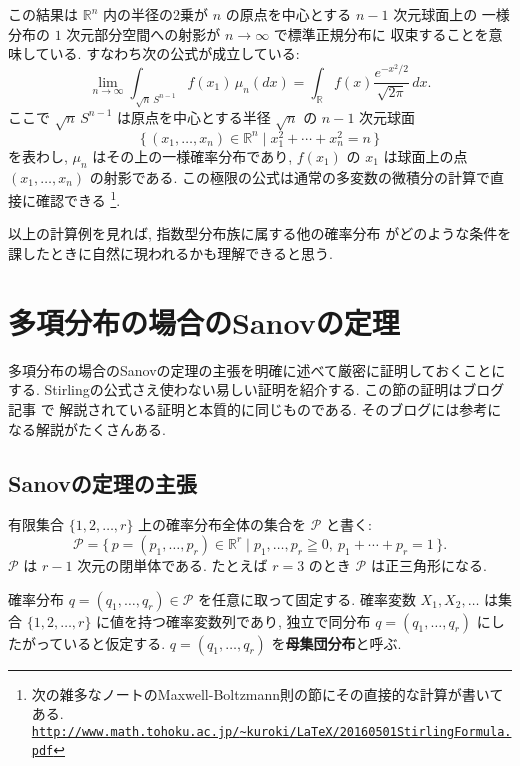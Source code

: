 \documentclass[12pt,twoside]{jarticle}
\newcommand\R{{\mathbb R}} %
\newcommand\cP{{\mathcal P}}
\theoremstyle{jplain}
\theoremstyle{jplain}
\theoremstyle{jplain}
\numberwithin{theorem}{section}
\numberwithin{equation}{section}
\numberwithin{figure}{section}
\numberwithin{table}{section}
\begin{document}
この結果は $\R^n$ 内の半径の2乗が $n$ の原点を中心とする $n-1$ 次元球面上の
一様分布の $1$ 次元部分空間への射影が $n\to\infty$ で標準正規分布に
収束することを意味している. すなわち次の公式が成立している:
\[
\lim_{n\to\infty}\int_{\sqrt{n}\,S^{n-1}} f(x_1)\,\mu_n(dx)
=\int_\R f(x)\frac{e^{-x^2/2}}{\sqrt{2\pi}}\,dx.
\]
ここで $\sqrt{n}\,S^{n-1}$ は原点を中心とする半径 $\sqrt{n}$ の $n-1$ 次元球面
\[
\{\,(x_1,\ldots,x_n)\in\R^n\mid x_1^2+\cdots+x_n^2=n\,\}
\]
を表わし, $\mu_n$ はその上の一様確率分布であり, 
$f(x_1)$ の $x_1$ は球面上の点 $(x_1,\ldots,x_n)$ の射影である.
この極限の公式は通常の多変数の微積分の計算で直接に確認できる%
\footnote{次の雑多なノートのMaxwell-Boltzmann則の節にその直接的な計算が書いてある. \\
\href{http://www.math.tohoku.ac.jp/~kuroki/LaTeX/20160501StirlingFormula.pdf}
{\tt http://www.math.tohoku.ac.jp/{\textasciitilde}kuroki/LaTeX/20160501StirlingFormula.pdf}}.

以上の計算例を見れば, 指数型分布族に属する他の確率分布
がどのような条件を課したときに自然に現われるかも理解できると思う.


\section{多項分布の場合のSanovの定理}
\label{sec:Sanov}

多項分布の場合のSanovの定理の主張を明確に述べて厳密に証明しておくことにする.
Stirlingの公式さえ使わない易しい証明を紹介する.
この節の証明はブログ記事 \cite{vanRamon2013} で
解説されている証明と本質的に同じものである.
そのブログには参考になる解説がたくさんある.


\subsection{Sanovの定理の主張}


有限集合 $\{1,2,\ldots,r\}$ 上の確率分布全体の集合を $\cP$ と書く:
\[
\cP = \{\,p=(p_1,\ldots,p_r)\in\R^r\mid p_1,\ldots,p_r\geqq 0,\ p_1+\cdots+p_r=1 \,\}.
\]
$\cP$ は $r-1$ 次元の閉単体である.
たとえば $r=3$ のとき $\cP$ は正三角形になる.

確率分布 $q=(q_1,\ldots,q_r)\in\cP$ を任意に取って固定する.
確率変数 $X_1,X_2,\ldots$ は集合 $\{1,2,\ldots,r\}$ に値を持つ確率変数列であり, 
独立で同分布 $q=(q_1,\ldots,q_r)$ にしたがっていると仮定する.
$q=(q_1,\ldots,q_r)$ を{\bf 母集団分布}と呼ぶ.
\end{document}
